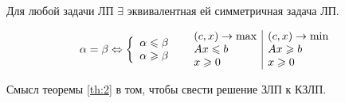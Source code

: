 \begin{theorem}\label{th:2}
    Для любой задачи ЛП $ \exists $ эквивалентная ей симметричная задача ЛП.
\end{theorem}

\begin{note}[Идея]
    \[
        \alpha = \beta \iff \left\{\begin{array}{l}
            \alpha \leqslant \beta \\
            \alpha \geqslant \beta
        \end{array}\right. \quad \begin{array}{l | l}
            (c,x)\rightarrow\max & (c,x) \rightarrow \min \\
            Ax \leqslant b       & Ax \geqslant b         \\
            x \geqslant 0        & x \geqslant 0
        \end{array}
    \]
\end{note}

\begin{remark}
    Смысл теоремы \ref{th:2} в том, чтобы свести решение ЗЛП к КЗЛП.
\end{remark}

